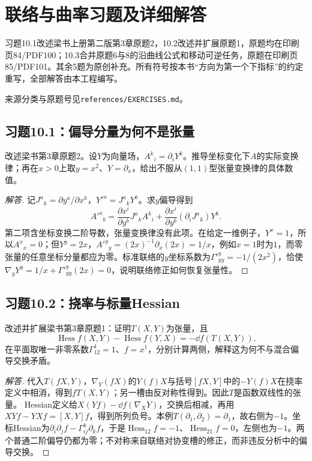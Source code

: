 \section{联络与曲率习题及详细解答}
习题10.1改述梁书上册第二版第3章原题2，10.2改述并扩展原题1，原题均在印刷页84/PDF100；10.3合并原题6与8的沿曲线公式和移动可逆任务，原题在印刷页85/PDF101。其余5题为原创补充。所有符号按本书“方向为第一个下指标”的约定重写，全部解答由本工程编写。

来源分类与原题号见\texttt{references/EXERCISES.md}。

\subsection*{习题10.1：偏导分量为何不是张量}
改述梁书第3章原题2。设$Y$为向量场，$A^k{}_i=\partial_iY^k$。推导坐标变化下$A$的实际变换律；再在$x>0$上取$y=x^2$、$Y=\partial_x$，给出不服从$(1,1)$型张量变换律的具体数值。
\begin{proof}[解答]
记$J^a{}_k=\partial y^a/\partial x^k$，$Y'^a=J^a{}_kY^k$。求$y$偏导得到
\[
 A'^a{}_b=\frac{\partial x^i}{\partial y^b}J^a{}_k A^k{}_i
 +\frac{\partial x^i}{\partial y^b}(\partial_iJ^a{}_k)Y^k.
\]
第二项含坐标变换二阶导数，张量变换律没有此项。在给定一维例子，$Y^x=1$，所以$A^x{}_x=0$；但$Y^y=2x$，$A'^y{}_y=(2x)^{-1}\partial_x(2x)=1/x$，例如$x=1$时为$1$，而零张量的任意坐标分量都应为零。标准联络的$y$坐标系数为$\Gamma'^y_{yy}=-1/(2x^2)$，恰使$\nabla_yY^y=1/x+\Gamma'^y_{yy}(2x)=0$，说明联络修正如何恢复张量性。
\end{proof}

\subsection*{习题10.2：挠率与标量Hessian}
改述并扩展梁书第3章原题1：证明$T(X,Y)$为张量，且
\[
 \operatorname{Hess}f(X,Y)-\operatorname{Hess}f(Y,X)=-\dd f(T(X,Y)).
\]
在平面取唯一非零系数$\Gamma^1_{12}=1$、$f=x^1$，分别计算两侧，解释这为何不与混合偏导交换矛盾。
\begin{proof}[解答]
代入$T(fX,Y)$，$\nabla_Y(fX)$的$Y(f)X$与括号$[fX,Y]$中的$-Y(f)X$在挠率定义中相消，得到$fT(X,Y)$；另一槽由反对称性得到。因此$T$是函数双线性的张量。
Hessian定义给$X(Yf)-\dd f(\nabla_XY)$，交换后相减，再用$XYf-YXf=[X,Y]f$，得到所列负号。本例$T(\partial_1,\partial_2)=\partial_1$，故右侧为$-1$。坐标Hessian为$\partial_i\partial_jf-\Gamma^k_{ij}\partial_kf$，于是$\operatorname{Hess}_{12}f=-1$、$\operatorname{Hess}_{21}f=0$，左侧也为$-1$。两个普通二阶偏导仍都为零；不对称来自联络对协变槽的修正，而非违反分析中的偏导交换。
\end{proof}

